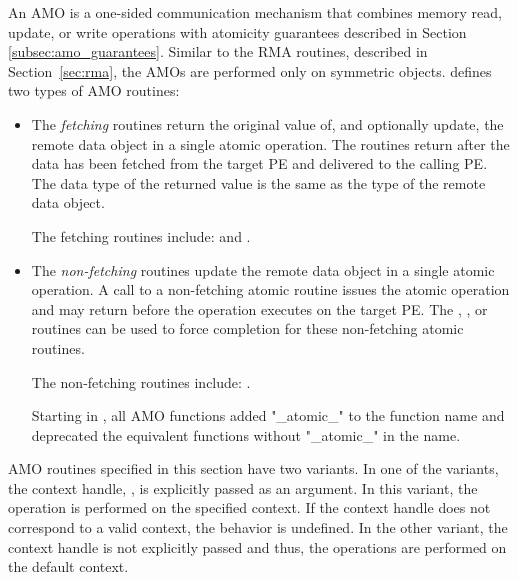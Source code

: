 An \ac{AMO} is a one-sided communication mechanism that combines memory read,
update, or write operations with atomicity guarantees described in Section~%
\ref{subsec:amo_guarantees}.  Similar to the \ac{RMA} routines, described in
Section~\ref{sec:rma}, the \acp{AMO} are performed only on symmetric objects.
\openshmem defines two types of \ac{AMO} routines:

\begin{itemize}

\item
  The \emph{fetching} routines return the original value of, and optionally
  update, the remote data object in a single atomic operation.  The routines
  return after the data has been fetched from the target \ac{PE} and delivered
  to the calling \ac{PE}.
  The data type of the returned value is the same as the type of
  the remote data object.

  The fetching routines include:
   and
  .

\item
  The \emph{non-fetching} routines update the remote data object in a single
  atomic operation.  A call to a non-fetching atomic routine issues the atomic
  operation and may return before the operation executes on the target \ac{PE}.
  The , , or 
  routines can be used to force completion for these non-fetching
  atomic routines.

  The non-fetching routines include:
  .

\begin{DeprecateBlock}

Starting in \openshmem[1.4], all \ac{AMO} functions added "\_atomic\_" to the function 
name and deprecated the equivalent functions without "\_atomic\_" in the name.

\end{DeprecateBlock}

\end{itemize}

\openshmem \ac{AMO} routines specified in this section have two variants. In
one of the variants, the context handle, , is explicitly passed as
an argument. In this variant, the operation is performed on the specified
context. If the context handle  does not correspond to a valid
context, the behavior is undefined. In the other variant, the context handle
is not explicitly passed and thus, the operations are performed on the
default context.

